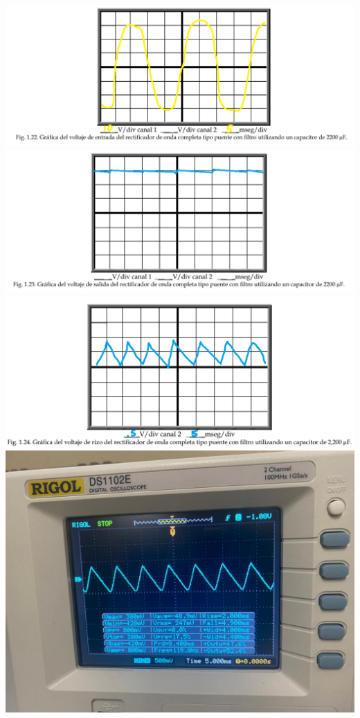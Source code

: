\documentclass[12pt]{article}
\begin{document}
\begin{enumerate}
\begin{enumerate}
            \begin{center}
                \includegraphics*[scale=0.45]{fig1-22.png}
                \includegraphics*[scale=0.45]{fig1-23.png}
                \includegraphics*[scale=0.45]{fig1-24.png}
                \includegraphics*[scale=0.2]{img1-24.jpg}
            \end{center}
       
            \end{enumerate}

        \end{enumerate}
\end{document}
